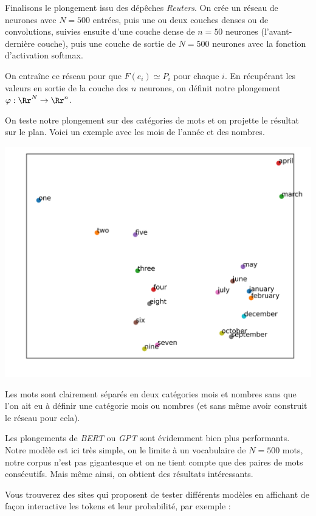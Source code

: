 \documentclass[11pt,class=report,crop=false]{standalone}
\begin{document}
\begin{exemple}
Finalisons le plongement issu des dépêches \emph{Reuters}.
On crée un réseau de neurones avec $N=500$ entrées,
puis une ou deux couches denses ou de convolutions, suivies ensuite d'une couche dense de $n=50$ neurones (l'avant-dernière couche), puis une couche de sortie de $N=500$ neurones avec la fonction d'activation softmax.


On entraîne ce réseau pour que $F(e_i) \simeq P_i$ pour chaque $i$.
En récupérant les valeurs en sortie de la couche des $n$ neurones, on définit notre plongement $\varphi : \Rr^N \to \Rr^n$.

On teste notre plongement sur des catégories de mots et on projette le résultat sur le plan.
Voici un exemple avec les mois de l'année et des nombres.

\begin{center}
	\includegraphics[scale=\myscale,scale=0.8]{figures/plongement-mots-1.png}
\end{center}
Les mots sont clairement séparés en deux catégories \og{}mois\fg{} et \og{}nombres\fg{} sans que l'on ait eu à définir une catégorie \og{}mois\fg{} ou \og{}nombres\fg{} (et sans même avoir construit le réseau pour cela).

Les plongements de \emph{BERT} ou \emph{GPT} sont évidemment bien plus performants.
Notre modèle est ici très simple, on le limite à un vocabulaire de $N=500$ mots, notre corpus n'est pas gigantesque et on ne tient compte que des paires de mots consécutifs. Mais même ainsi, on obtient des résultats intéressants.
\end{exemple}


\vfill
Vous trouverez des sites qui proposent de tester différents modèles en affichant de façon interactive les tokens et leur probabilité, par exemple :
\end{document}
